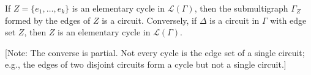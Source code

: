 If $Z = \{e_1, \ldots, e_k\}$ is an elementary cycle in $\mathcal{L}(\Gamma)$, then the submultigraph $\Gamma_Z$ formed by the edges of $Z$ is a circuit. Conversely, if $\Delta$ is a circuit in $\Gamma$ with edge set $Z$, then $Z$ is an elementary cycle in $\mathcal{L}(\Gamma)$.

[Note: The converse is partial. Not every cycle is the edge set of a single circuit; e.g., the edges of two disjoint circuits form a cycle but not a single circuit.]
